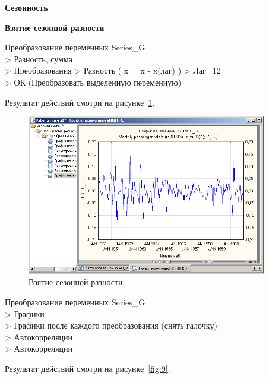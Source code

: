 
\newpage

\begin{center}
  \textbf{Сезонность}
\end{center}

\begin{center}
  \textbf{Взятие сезонной разности}
\end{center}

Преобразование переменных Series\_G\\
> Разность, сумма\\
> Преобразования  > Разность ( x = x - x(лаг) ) > Лаг=12\\
> ОК (Преобразовать выделенную переменную)

Результат действий смотри на рисунке~\ref{fig:8}.

\begin{figure}[!h]
  \centering

  \includegraphics[height=7cm]
  {inc/8.PNG}

  \caption{Взятие сезонной разности}

  \label{fig:8}
\end{figure}

Преобразование переменных Series\_G\\
> Графики\\
> Графики после каждого преобразования (снять галочку)\\
> Автокорреляции\\
> Автокорреляции

Результат действий смотри на рисунке~\ref{fig:9}.

